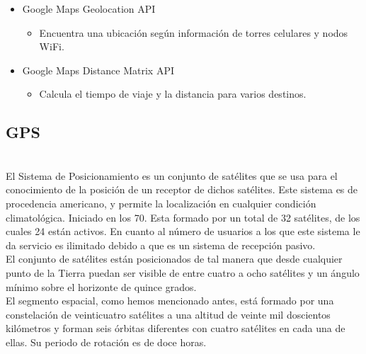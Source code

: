 \documentclass[a4paper, 11pt]{article}
\begin{document}
\begin{itemize}
\begin{itemize}
\begin{itemize}
\begin{itemize}
{                                cualquier lugar del mundo.}
                      \end{itemize}
                    \item{Google Maps Geolocation API}
                        \begin{itemize}
                            \item{Encuentra una ubicación según información de
                                  torres celulares y nodos WiFi.}
                        \end{itemize}
                      \item{Google Maps Distance Matrix API}
                        \begin{itemize}
                            \item{Calcula el tiempo de viaje y la distancia para
                                  varios destinos.}
                        \end{itemize}
                \end{itemize}
          \end{itemize}

        \subsection{GPS}\\

          El Sistema de Posicionamiento es un conjunto de satélites que se usa
          para el conocimiento de la posición de un receptor de dichos satélites.
          Este sistema es de procedencia americano, y permite la localización en
          cualquier condición climatológica. Iniciado en los 70. Esta formado
          por un total de 32 satélites, de los cuales 24 están activos. En
          cuanto al número de usuarios a los que este sistema le da servicio es
          ilimitado debido a que es un sistema de recepción pasivo.\\

          El conjunto de satélites están posicionados de tal manera que desde
          cualquier punto de la Tierra puedan ser visible de entre cuatro a
          ocho satélites y un ángulo mínimo sobre el horizonte de quince grados.\\

          El segmento espacial, como hemos mencionado antes, está formado por
          una constelación de veinticuatro satélites a una altitud de veinte mil
          doscientos kilómetros y forman seis órbitas diferentes con cuatro
          satélites en cada una de ellas. Su periodo de rotación es de doce
          horas.\\


\end{itemize}
\end{document}

